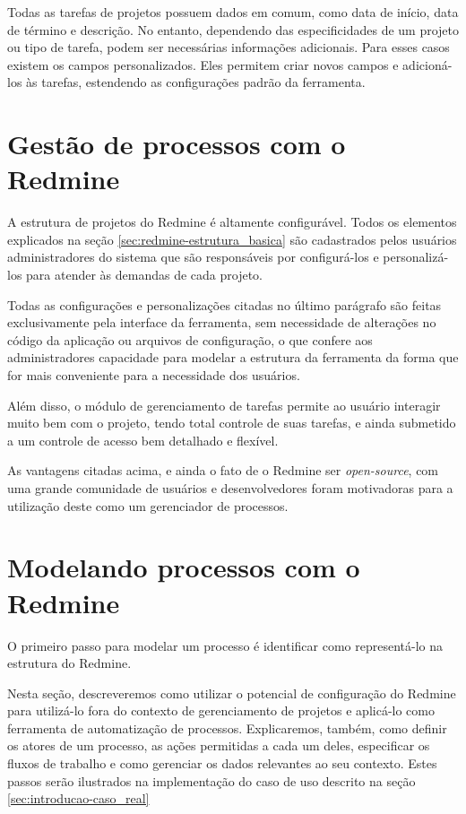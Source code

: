 Todas as tarefas de projetos possuem dados em comum, como data de início, data de término e descrição. No entanto, dependendo das especificidades de um projeto ou tipo de tarefa, podem ser necessárias informações adicionais. Para esses casos existem os campos personalizados. Eles permitem criar novos campos e adicioná-los às tarefas, estendendo as configurações padrão da ferramenta.

\section{Gestão de processos com o Redmine}\label{sec:redmine-gestao_processos}

A estrutura de projetos do Redmine é altamente configurável. Todos os elementos explicados na seção \ref{sec:redmine-estrutura_basica} são cadastrados pelos usuários administradores do sistema que são responsáveis por configurá-los e personalizá-los para atender às demandas de cada projeto.

Todas as configurações e personalizações citadas no último parágrafo são feitas exclusivamente pela interface da ferramenta, sem necessidade de alterações no código da aplicação ou arquivos de configuração, o que confere aos administradores capacidade para modelar a estrutura da ferramenta da forma que for mais conveniente para a necessidade dos usuários.

Além disso, o módulo de gerenciamento de tarefas permite ao usuário interagir muito bem com o projeto, tendo total controle de suas tarefas, e ainda submetido a um controle de acesso bem detalhado e flexível.

As vantagens citadas acima, e ainda o fato de o Redmine ser \textit{open-source}, com uma grande comunidade de usuários e desenvolvedores foram motivadoras para a utilização deste como um gerenciador de processos.

\section{Modelando processos com o Redmine}\label{sec:redmine-automatizar_processo}

O primeiro passo para modelar um processo é identificar como representá-lo na estrutura do Redmine.

Nesta seção, descreveremos como utilizar o potencial de configuração do Redmine para utilizá-lo fora do contexto de gerenciamento de projetos e aplicá-lo como ferramenta de automatização de processos. Explicaremos, também, como definir os atores de um processo, as ações permitidas a cada um deles, especificar os fluxos de trabalho e como gerenciar os dados relevantes ao seu contexto. Estes passos serão ilustrados na implementação do caso de uso descrito na seção \ref{sec:introducao-caso_real}

